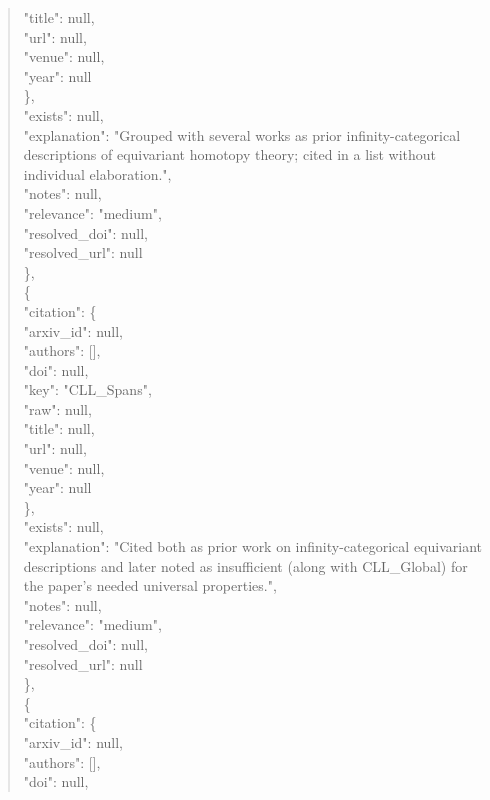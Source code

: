 \documentclass[11pt]{article}
\begin{document}
\begin{quote}
        "title": null,\\
        "url": null,\\
        "venue": null,\\
        "year": null\\
      \},\\
      "exists": null,\\
      "explanation": "Grouped with several works as prior infinity-categorical descriptions of equivariant homotopy theory; cited in a list without individual elaboration.",\\
      "notes": null,\\
      "relevance": "medium",\\
      "resolved\_doi": null,\\
      "resolved\_url": null\\
    \},\\
    \{\\
      "citation": \{\\
        "arxiv\_id": null,\\
        "authors": [],\\
        "doi": null,\\
        "key": "CLL\_Spans",\\
        "raw": null,\\
        "title": null,\\
        "url": null,\\
        "venue": null,\\
        "year": null\\
      \},\\
      "exists": null,\\
      "explanation": "Cited both as prior work on infinity-categorical equivariant descriptions and later noted as insufficient (along with CLL\_Global) for the paper's needed universal properties.",\\
      "notes": null,\\
      "relevance": "medium",\\
      "resolved\_doi": null,\\
      "resolved\_url": null\\
    \},\\
    \{\\
      "citation": \{\\
        "arxiv\_id": null,\\
        "authors": [],\\
        "doi": null,\\

\end{quote}
\end{document}
